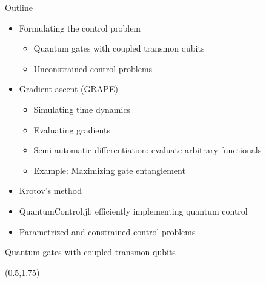 \documentclass[compress, aspectratio=169]{beamer}
\begin{document}
\begin{frame}{Outline}
  \begin{itemize}
    \item Formulating the control problem
      \begin{itemize}
        \item Quantum gates with coupled transmon qubits
        \item Unconstrained control problems
      \end{itemize}
    \pause
    \item Gradient-ascent (GRAPE)
      \begin{itemize}
        \item Simulating time dynamics
        \item Evaluating gradients
        \item Semi-automatic differentiation: evaluate arbitrary functionals
        \item Example: Maximizing gate entanglement
      \end{itemize}
    \pause
    \item Krotov's method
    \pause
    \item QuantumControl.jl: efficiently implementing quantum control
    \pause
    \item Parametrized and constrained control problems
  \end{itemize}
\end{frame}


\begin{frame}{Quantum gates with coupled transmon qubits}
  \begin{textblock}{15.0}(0.5,1.75)
    \begin{center}
    \end{center}
  \end{textblock}
\end{frame}
\end{document}
